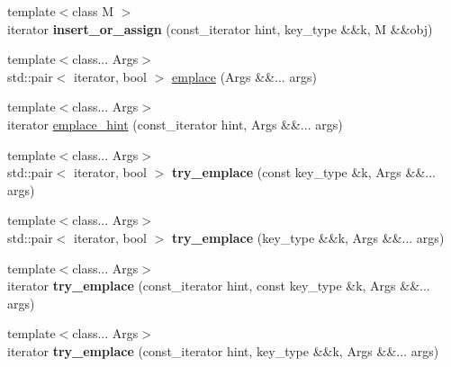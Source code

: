 \begin{DoxyCompactItemize}
\mbox{\label{classtsl_1_1robin__map_ad5145c93d33b1dc38b3dbf04b247b37e}} 
{\footnotesize template$<$class M $>$ }\\iterator {\bfseries insert\+\_\+or\+\_\+assign} (const\+\_\+iterator hint, key\+\_\+type \&\&k, M \&\&obj)
\item 
{\footnotesize template$<$class... Args$>$ }\\std\+::pair$<$ iterator, bool $>$ \mbox{\hyperlink{classtsl_1_1robin__map_a2bed728f16977c4eb16251727fa14090}{emplace}} (Args \&\&... args)
\item 
{\footnotesize template$<$class... Args$>$ }\\iterator \mbox{\hyperlink{classtsl_1_1robin__map_ad3db483f5b734b8450f9c9a32ef393b3}{emplace\+\_\+hint}} (const\+\_\+iterator hint, Args \&\&... args)
\item 
\mbox{\label{classtsl_1_1robin__map_a0a4b90f667e51fd243a2e3095a2aa4f9}} 
{\footnotesize template$<$class... Args$>$ }\\std\+::pair$<$ iterator, bool $>$ {\bfseries try\+\_\+emplace} (const key\+\_\+type \&k, Args \&\&... args)
\item 
\mbox{\label{classtsl_1_1robin__map_abe1c93d07594f455f46f660d1cbfce72}} 
{\footnotesize template$<$class... Args$>$ }\\std\+::pair$<$ iterator, bool $>$ {\bfseries try\+\_\+emplace} (key\+\_\+type \&\&k, Args \&\&... args)
\item 
\mbox{\label{classtsl_1_1robin__map_a34a63cc59d02a6faf42a3f4786991b66}} 
{\footnotesize template$<$class... Args$>$ }\\iterator {\bfseries try\+\_\+emplace} (const\+\_\+iterator hint, const key\+\_\+type \&k, Args \&\&... args)
\item 
\mbox{\label{classtsl_1_1robin__map_adc86ac42162fad06605d84e3fe5bae8a}} 
{\footnotesize template$<$class... Args$>$ }\\iterator {\bfseries try\+\_\+emplace} (const\+\_\+iterator hint, key\+\_\+type \&\&k, Args \&\&... args)
\item 
\mbox{\label{classtsl_1_1robin__map_aeaa3b4c24634e7b2f905ba2a7964d409}} 

\end{DoxyCompactItemize}
